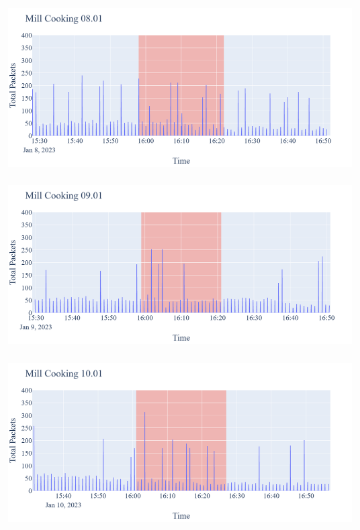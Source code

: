 \begin{figure}[H]
    \begin{subfigure}[b]{0.5\textwidth}
        \centering
        \includegraphics[width=1.2\hsize]{figures/Mill_Cooking_Packets_08.01.png}
    \end{subfigure}
    \begin{subfigure}[b]{0.5\textwidth}
        \centering
        \includegraphics[width=1.2\hsize]{figures/Mill_Cooking_Packets_09.01.png}
    \end{subfigure}
    \begin{subfigure}[b]{0.5\textwidth}
        \centering
        \includegraphics[width=1.2\hsize]{figures/Mill_Cooking_Packets_10.01.png}
    \end{subfigure}
    \begin{subfigure}[b]{0.5\textwidth}

\end{subfigure}
\end{figure}
